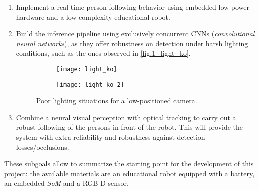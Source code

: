 	\begin{enumerate}
		\item Implement a real-time person following behavior using embedded low-power hardware and a low-complexity educational robot.
		
		\item Build the inference pipeline using exclusively concurrent CNNs (\textit{convolutional neural networks}), as they offer robustness on detection under harsh lighting conditions, such as the ones observed in \autoref{fig:1_light_ko}.
		
			\begin{figure}[h]
			\centering
			\begin{subfigure}[b]{0.4\linewidth}
				\centering
				\texttt{[image: light\_ko]}
			\end{subfigure}
			\hfill
			\begin{subfigure}[b]{0.5\linewidth}
				\centering
				\texttt{[image: light\_ko\_2]}
			\end{subfigure}		
			
			\caption{Poor lighting situations for a low-positioned camera.}
			\label{fig:1_light_ko}
		\end{figure}
		
		
		\item Combine a neural visual perception with optical tracking to carry out a robust following of the persons in front of the robot. This will provide the system with extra reliability and robustness against detection losses/occlusions.
	\end{enumerate}
	
These subgoals allow to summarize the starting point for the development of this project: the available materials are an educational robot equipped with a battery, an embedded \textit{SoM} and a RGB-D sensor.


